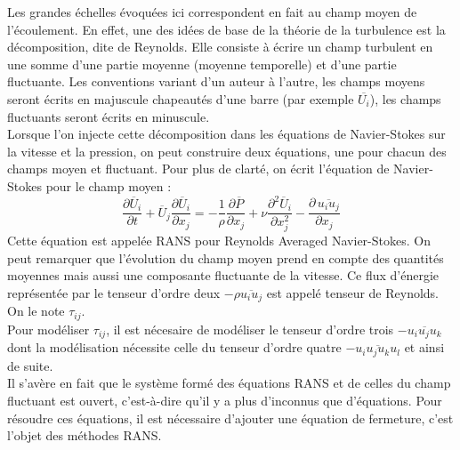 \documentclass[a4paper,12pt]{article}
\newcommand{\cad}{c'est-à-dire}
\newcommand{\NS}{Navier-Stokes}
\numberwithin{equation}{section} %
\begin{document}
\noindent Les grandes échelles évoquées ici correspondent en fait au champ moyen de l'écoulement. En effet, une des idées de base de la théorie de la turbulence est la décomposition, dite de Reynolds. Elle consiste à écrire un champ turbulent en une somme d'une partie moyenne (moyenne temporelle) et d'une partie fluctuante. Les conventions variant d'un auteur à l'autre, les champs moyens seront écrits en majuscule chapeautés d'une barre (par exemple $\overline{U_i}$), les champs fluctuants seront écrits en minuscule. \\
Lorsque l'on injecte cette décomposition dans les équations de \NS $ $ sur la vitesse et la pression, on peut construire deux équations, une pour chacun des champs moyen et fluctuant. Pour plus de clarté, on écrit l'équation de \NS $ $ pour le champ moyen : 
\begin{equation}
 \frac{\partial \overline{U}_i}{\partial t} + \overline{U}_j \frac{\partial \overline{U}_i}{\partial x_j} = -\frac{1}{\rho} \frac{\partial \overline{P}}{\partial x_j} + \nu \frac{\partial^2 \overline{U}_i}{\partial x_j^2}  - \frac{\partial \, \overline{u_iu_j}}{\partial x_j} \label{meanfield}
 \end{equation}
  Cette équation est appelée RANS pour Reynolds Averaged \NS. On peut remarquer que l'évolution du champ moyen prend en compte des quantités moyennes mais aussi une composante fluctuante de la vitesse. Ce flux d'énergie représentée par le tenseur d'ordre deux $-\rho \overline{u_iu_j}$ est appelé tenseur de Reynolds. On le note $\tau_{ij}$.\\
Pour modéliser $\tau_{ij}$, il est nécesaire de modéliser le tenseur d'ordre trois $-\overline{u_iu_ju_k}$ dont la modélisation nécessite celle du tenseur d'ordre quatre $-\overline{u_iu_ju_ku_l}$ et ainsi de suite. \\
  Il s'avère en fait que le système formé des équations RANS et de celles du champ fluctuant est ouvert, \cad $ $ qu'il y a plus d'inconnus que d'équations. Pour résoudre ces équations, il est nécessaire d'ajouter une équation de fermeture, c'est l'objet des méthodes RANS.\\ %
  
\end{document}
